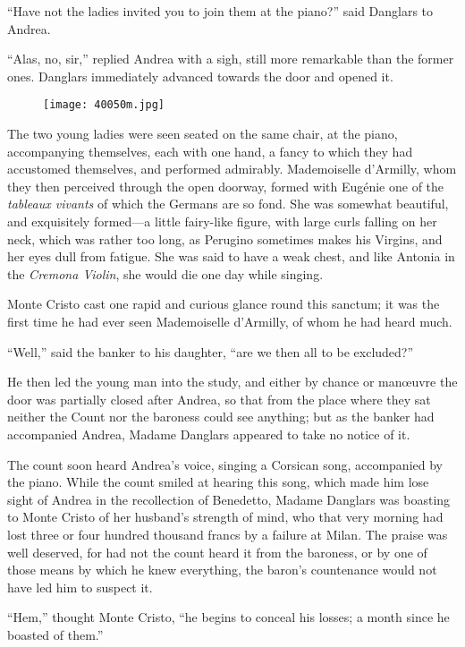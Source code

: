 “Have not the ladies invited you to join them at the piano?” said
Danglars to Andrea.

“Alas, no, sir,” replied Andrea with a sigh, still more remarkable than
the former ones. Danglars immediately advanced towards the door and
opened it.

\begin{figure}[ht]
\texttt{[image: 40050m.jpg]}
\end{figure}

The two young ladies were seen seated on the same chair, at the piano,
accompanying themselves, each with one hand, a fancy to which they had
accustomed themselves, and performed admirably. Mademoiselle d’Armilly,
whom they then perceived through the open doorway, formed with Eugénie
one of the \textit{tableaux vivants} of which the Germans are so fond. She was
somewhat beautiful, and exquisitely formed—a little fairy-like figure,
with large curls falling on her neck, which was rather too long, as
Perugino sometimes makes his Virgins, and her eyes dull from fatigue.
She was said to have a weak chest, and like Antonia in the \textit{Cremona
Violin}, she would die one day while singing.

Monte Cristo cast one rapid and curious glance round this sanctum; it
was the first time he had ever seen Mademoiselle d’Armilly, of whom he
had heard much.

“Well,” said the banker to his daughter, “are we then all to be
excluded?”

He then led the young man into the study, and either by chance or
manœuvre the door was partially closed after Andrea, so that from the
place where they sat neither the Count nor the baroness could see
anything; but as the banker had accompanied Andrea, Madame Danglars
appeared to take no notice of it.

The count soon heard Andrea’s voice, singing a Corsican song,
accompanied by the piano. While the count smiled at hearing this song,
which made him lose sight of Andrea in the recollection of Benedetto,
Madame Danglars was boasting to Monte Cristo of her husband’s strength
of mind, who that very morning had lost three or four hundred thousand
francs by a failure at Milan. The praise was well deserved, for had not
the count heard it from the baroness, or by one of those means by which
he knew everything, the baron’s countenance would not have led him to
suspect it.

“Hem,” thought Monte Cristo, “he begins to conceal his losses; a month
since he boasted of them.”

